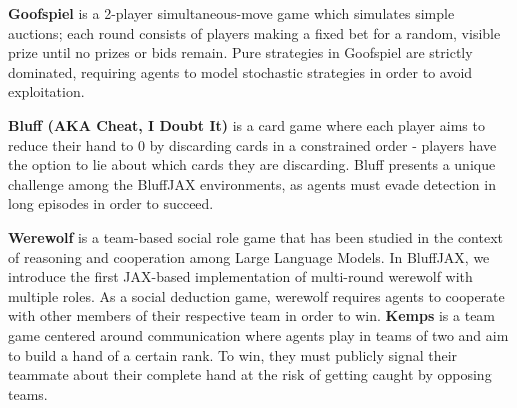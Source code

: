 \textbf{Goofspiel} is a 2-player simultaneous-move game which simulates simple auctions; each round consists of players making a fixed bet for a random, visible prize until no prizes or bids remain. Pure strategies in Goofspiel are strictly dominated, requiring agents to model stochastic strategies in order to avoid exploitation.

\textbf{Bluff (AKA Cheat, I Doubt It)} is a card game where each player aims to reduce their hand to 0 by discarding cards in a constrained order - players have the option to lie about which cards they are discarding. Bluff presents a unique challenge among the BluffJAX environments, as agents must evade detection in long episodes in order to succeed.

\textbf{Werewolf} is a team-based social role game that has been studied in the context of reasoning and cooperation among Large Language Models. In BluffJAX, we introduce the first JAX-based implementation of multi-round werewolf with multiple roles. As a social deduction game, werewolf requires agents to cooperate with other members of their respective team in order to win. \textbf{Kemps} is a team game centered around communication where agents play in teams of two and aim to build a hand of a certain rank. To win, they must publicly signal their teammate about their complete hand at the risk of getting caught by opposing teams.

